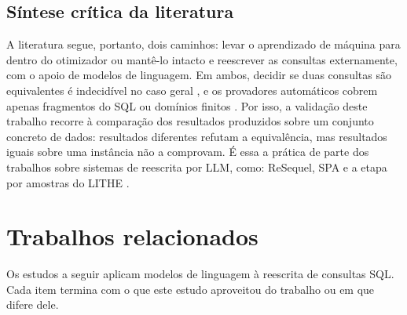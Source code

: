 \documentclass[12pt]{article}
\begin{document}
\subsection{Síntese crítica da literatura}
\label{sec:sintese}

A literatura segue, portanto, dois caminhos: levar o aprendizado de máquina para dentro do otimizador ou mantê-lo intacto e reescrever as consultas externamente, com o apoio de modelos de linguagem. Em ambos, decidir se duas consultas são equivalentes é indecidível no caso geral \cite{ahv1995}, e os provadores automáticos cobrem apenas fragmentos do SQL ou domínios finitos \cite{cosette2017,equitas2019,spes2022,verieql2024}. Por isso, a validação deste trabalho recorre à comparação dos resultados produzidos sobre um conjunto concreto de dados: resultados diferentes refutam a equivalência, mas resultados iguais sobre uma instância não a comprovam. É essa a prática de parte dos trabalhos sobre sistemas de reescrita por LLM, como: ReSequel, SPA e a etapa por amostras do LITHE \cite{fathollahzadeh2026resequel,huang2026spa,dharwada2026lithe}.

\section{Trabalhos relacionados}
\label{sec:relacionados}

Os estudos a seguir aplicam modelos de linguagem à reescrita de consultas SQL. Cada item termina com o que este estudo aproveitou do trabalho ou em que difere dele.
\end{document}
